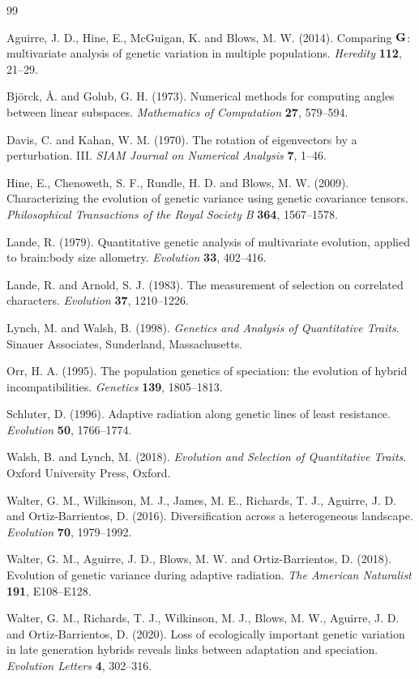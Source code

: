 \clearpage
\begin{thebibliography}{99}

Aguirre, J. D., Hine, E., McGuigan, K. and Blows, M. W. (2014).
Comparing \(\mathbf{G}\): multivariate analysis of genetic variation in multiple populations.
\emph{Heredity} \textbf{112}, 21--29.

Bj\"orck, \AA. and Golub, G. H. (1973).
Numerical methods for computing angles between linear subspaces.
\emph{Mathematics of Computation} \textbf{27}, 579--594.

Davis, C. and Kahan, W. M. (1970).
The rotation of eigenvectors by a perturbation. III.
\emph{SIAM Journal on Numerical Analysis} \textbf{7}, 1--46.

Hine, E., Chenoweth, S. F., Rundle, H. D. and Blows, M. W. (2009).
Characterizing the evolution of genetic variance using genetic covariance tensors.
\emph{Philosophical Transactions of the Royal Society B} \textbf{364}, 1567--1578.

Lande, R. (1979).
Quantitative genetic analysis of multivariate evolution, applied to brain:body size allometry.
\emph{Evolution} \textbf{33}, 402--416.

Lande, R. and Arnold, S. J. (1983).
The measurement of selection on correlated characters.
\emph{Evolution} \textbf{37}, 1210--1226.

Lynch, M. and Walsh, B. (1998).
\emph{Genetics and Analysis of Quantitative Traits}.
Sinauer Associates, Sunderland, Massachusetts.

Orr, H. A. (1995).
The population genetics of speciation: the evolution of hybrid incompatibilities.
\emph{Genetics} \textbf{139}, 1805--1813.

Schluter, D. (1996).
Adaptive radiation along genetic lines of least resistance.
\emph{Evolution} \textbf{50}, 1766--1774.

Walsh, B. and Lynch, M. (2018).
\emph{Evolution and Selection of Quantitative Traits}.
Oxford University Press, Oxford.

Walter, G. M., Wilkinson, M. J., James, M. E., Richards, T. J., Aguirre, J. D. and Ortiz-Barrientos, D. (2016).
Diversification across a heterogeneous landscape.
\emph{Evolution} \textbf{70}, 1979--1992.

Walter, G. M., Aguirre, J. D., Blows, M. W. and Ortiz-Barrientos, D. (2018).
Evolution of genetic variance during adaptive radiation.
\emph{The American Naturalist} \textbf{191}, E108--E128.

Walter, G. M., Richards, T. J., Wilkinson, M. J., Blows, M. W., Aguirre, J. D. and Ortiz-Barrientos, D. (2020).
Loss of ecologically important genetic variation in late generation hybrids reveals links between adaptation and speciation.
\emph{Evolution Letters} \textbf{4}, 302--316.

\end{thebibliography}
